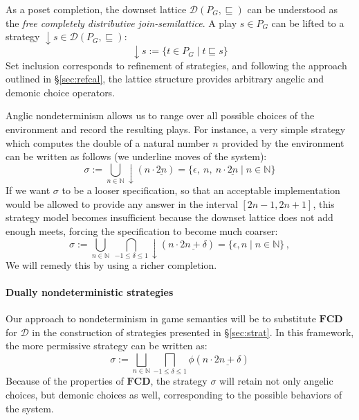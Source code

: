 \documentclass[format=sigplan,authordraft]{acmart}
\begin{document}
As a poset completion,
the downset lattice
$\mathcal{D}(P_G, {\sqsubseteq})$
can be understood as
the \emph{free completely distributive join-semilattice}.
A play $s \in P_G$ can be lifted to a strategy
${\downarrow} s \in \mathcal{D}(P_G, {\sqsubseteq})$:
\[
    {\downarrow} s := \{ t \in P_G \mid t \sqsubseteq s \}
\]
Set inclusion corresponds to refinement of strategies,
and following the approach outlined in \S\ref{sec:refcal},
the lattice structure provides
arbitrary angelic and demonic choice operators.

Anglic nondeterminism
allows us to range over all possible choices of the environment
and record the resulting plays.
For instance,
a very simple strategy which computes
the double of a natural number $n$
provided by the environment
can be written as follows
(we underline moves of the system):
\[
  \sigma :=
    \bigcup_{n \in \mathbb{N}} {\downarrow}(n \cdot \underline{2n}) =
    \{ \epsilon, \: n, \: n \cdot \underline{2n} \mid n \in \mathbb{N} \}
\]
If we want $\sigma$ to be a looser specification,
so that an acceptable implementation
would be allowed to provide any answer in the interval
$[2n - 1, 2n + 1]$,
this strategy model becomes insufficient
because the downset lattice does not add enough meets,
forcing the specification to become
much coarser:
\[
  \sigma :=
    \bigcup_{n \in \mathbb{N}} \:
    \bigcap_{-1 \le \delta \le 1}
    {\downarrow}(n \cdot \underline{2n+\delta}) =
    \{ \epsilon, n \mid n \in \mathbb{N} \} \,,
\]
We will remedy this by using a richer completion.


\paragraph{Dually nondeterministic strategies} %

Our approach to nondeterminism in game semantics
will be to substitute $\mathbf{FCD}$ for $\mathcal{D}$
in the construction of strategies presented in \S\ref{sec:strat}.
In this framework,
the more permissive strategy
can be written as:
\[
  \sigma :=
    \bigsqcup_{n \in \mathbb{N}}
    \bigsqcap_{-1 \le \delta \le 1}
    \phi(n \cdot \underline{2n + \delta})
\]
Because of the properties of $\mathbf{FCD}$,
the strategy $\sigma$ will retain
not only angelic choices,
but demonic choices as well,
corresponding to the possible behaviors
of the system.
\end{document}
